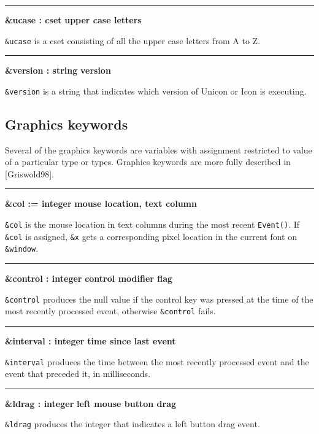 \bigskip\hrule\vspace{0.1cm}
\noindent
{\bf \&ucase : cset } \hfill {\bf upper case letters}

\noindent
{}\texttt{\&ucase} is a cset consisting of all the upper
case letters from A to Z.

\bigskip\hrule\vspace{0.1cm}
\noindent
{\bf \&version : string } \hfill {\bf version}

\noindent
{}\texttt{\&version} is a string that indicates which
version of Unicon or Icon is executing.

\subsection*{Graphics keywords}

Several of the graphics keywords are variables with assignment
restricted to value of a particular type or types. Graphics keywords
are more fully described in [Griswold98].

\bigskip\hrule\vspace{0.1cm}
\noindent
{\bf \&col := integer } \hfill {\bf mouse location, text column}

\noindent
\texttt{\&col} is the mouse location in text columns during the most
recent \texttt{Event()}. If \texttt{\&col} is assigned, \texttt{\&x}
gets a corresponding pixel location in the current font on
\texttt{\&window}.

\bigskip\hrule\vspace{0.1cm}
\noindent
{\bf \&control : integer } \hfill {\bf control modifier flag}

\noindent
\texttt{\&control} produces the null value if the control key was
pressed at the time of the most recently processed event, otherwise
\texttt{\&control} fails.

\bigskip\hrule\vspace{0.1cm}
\noindent
{\bf \&interval : integer } \hfill {\bf time since last event}

\noindent
\texttt{\&interval} produces the time between the most recently
processed event and the event that preceded it, in milliseconds.

\bigskip\hrule\vspace{0.1cm}
\noindent
{\bf \&ldrag : integer } \hfill {\bf left mouse button drag}

\noindent
\texttt{\&ldrag} produces the integer that indicates a left button drag
event.

